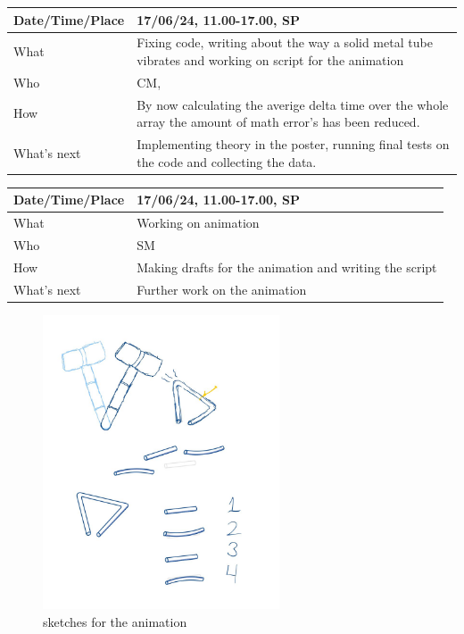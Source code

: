 \documentclass{article}
\begin{document}
\begin{table}[H]
\begin{tabular}{|p{1.5in}|p{4in}|}
\hline
Date/Time/Place & 17/06/24, 11.00-17.00, SP \\ \hline
What            & Fixing code, writing about the way a solid metal tube vibrates and working on script for the animation \\ \hline
Who             & CM,\\ \hline
How             & By now calculating the averige delta time over the whole array the amount of math error's has been reduced. \\ \hline
What's next     & Implementing theory in the poster, running final tests on the code and collecting the data.  \\ \hline
\end{tabular}
\end{table}

\begin{table}[H]
\begin{tabular}{|p{1.5in}|p{4in}|}
\hline
Date/Time/Place & 17/06/24, 11.00-17.00, SP \\ \hline
What            & Working on animation \\ \hline
Who             & SM \\ \hline
How             & Making drafts for the animation and writing the script \\ \hline
What's next     & Further work on the animation \\ \hline
\end{tabular}
\end{table}

\begin{figure}[H]
    \centering
    \includegraphics[width=7cm]{Sketch animatie.jpg}
    \caption{sketches for the animation}   
\end{figure}
\end{document}

